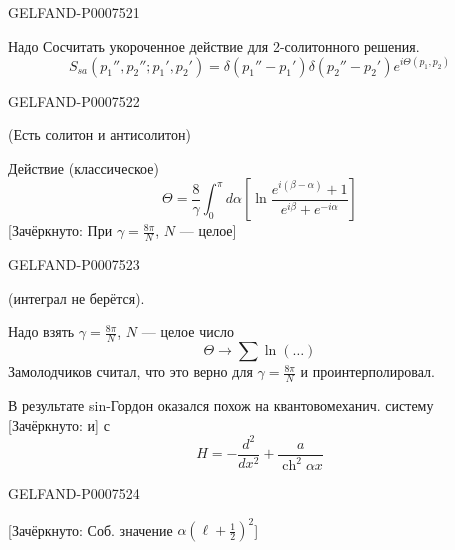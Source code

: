 \begin{GelfandAdjacentEvidence}{GELFAND-P000752}{1}


Надо Сосчитать укороченное действие для 2-солитонного решения.
\begin{equation*}
S_{sa}(p_1'',p_2'';p_1',p_2')
=\delta(p_1''-p_1')\delta(p_2''-p_2')e^{i\Theta(p_1,p_2)}
\tag{46}
\end{equation*}
\end{GelfandAdjacentEvidence}
\begin{GelfandAdjacentEvidence}{GELFAND-P000752}{2}

(Есть солитон и антисолитон)

Действие (классическое)
\begin{equation*}
\Theta=\frac8\gamma\int_0^\pi d\alpha
\left[\ln\frac{e^{i(\beta-\alpha)}+1}{e^{i\beta}+e^{-i\alpha}}\right]
\tag{47}
\end{equation*}
[Зачёркнуто: При \(\gamma=\frac{8\pi}{N}\), \(N\) --- целое]
\end{GelfandAdjacentEvidence}
\begin{GelfandAdjacentEvidence}{GELFAND-P000752}{3}

(интеграл не берётся).

Надо взять \(\gamma=\frac{8\pi}{N}\), \(N\) --- целое число
\begin{equation*}
\Theta\longrightarrow\sum\ln(\ldots)
\tag{48}
\end{equation*}
Замолодчиков считал, что это верно для \(\gamma=\frac{8\pi}{N}\) и проинтерполировал.

В результате sin-Гордон оказался похож на квантовомеханич. систему [Зачёркнуто: и] с
\begin{equation*}
H=-\frac{d^2}{dx^2}+\frac{a}{\operatorname{ch}^2\alpha x}
\tag{49}
\end{equation*}
\end{GelfandAdjacentEvidence}
\begin{GelfandAdjacentEvidence}{GELFAND-P000752}{4}

[Зачёркнуто: Соб. значение \(\alpha(\ell+\tfrac12)^2\)]
\end{GelfandAdjacentEvidence}
